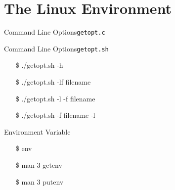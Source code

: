 \section{The Linux Environment}
\label{sec:linux-environment}

\begin{frame}{Command Line Options}{\texttt{getopt.c}}
  \begin{center}
  \end{center}
  \qquad\qquad{}
\end{frame}

\begin{frame}{Command Line Options}{\texttt{getopt.sh}}
  \begin{center}
  \end{center}
  \ttfamily
  \begin{itemize}
  \item[\$] ./getopt.sh -h
  \item[\$] ./getopt.sh -lf filename
  \item[\$] ./getopt.sh -l -f filename
  \item[\$] ./getopt.sh -f filename -l
  \end{itemize}
\end{frame}

\begin{frame}{Environment Variable}
  \begin{minipage}{.5\linewidth}
    \begin{center}
    \end{center}
  \end{minipage}\quad
  \begin{minipage}{.45\linewidth}
  \ttfamily
  \begin{itemize}
  \item[\$] env
  \item[\$] man 3 getenv
  \item[\$] man 3 putenv
  \end{itemize}  
  \end{minipage}
\end{frame}


